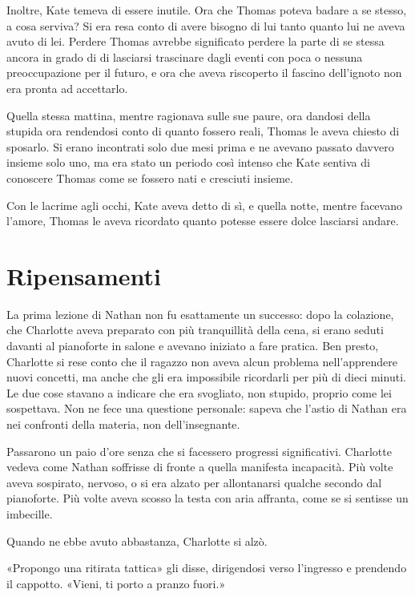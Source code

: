 \documentclass[a4paper,oneside,11pt]{memoir}
\begin{document}
Inoltre, Kate temeva di essere inutile. Ora che Thomas poteva badare a se stesso, a cosa serviva? Si era resa conto di
avere bisogno di lui tanto quanto lui ne aveva avuto di lei. Perdere Thomas avrebbe significato perdere la parte di se
stessa ancora in grado di di lasciarsi trascinare dagli eventi con poca o nessuna preoccupazione per il futuro, e ora
che aveva riscoperto il fascino dell'ignoto non era pronta ad accettarlo.

Quella stessa mattina, mentre ragionava sulle sue paure, ora dandosi della stupida ora rendendosi conto di quanto
fossero reali, Thomas le aveva chiesto di sposarlo. Si erano incontrati solo due mesi prima e ne avevano passato davvero
insieme solo uno, ma era stato un periodo così intenso che Kate sentiva di conoscere Thomas come se fossero nati e
cresciuti insieme.

Con le lacrime agli occhi, Kate aveva detto di sì, e quella notte, mentre facevano l'amore, Thomas le aveva ricordato
quanto potesse essere dolce lasciarsi andare.

\chapter{Ripensamenti}

La prima lezione di Nathan non fu esattamente un successo: dopo la colazione, che Charlotte aveva preparato con più
tranquillità della cena, si erano seduti davanti al pianoforte in salone e avevano iniziato a fare pratica. Ben presto,
Charlotte si rese conto che il ragazzo non aveva alcun problema nell'apprendere nuovi concetti, ma anche che gli era
impossibile ricordarli per più di dieci minuti. Le due cose stavano a indicare che era svogliato, non stupido, proprio
come lei sospettava. Non ne fece una questione personale: sapeva che l'astio di Nathan era nei confronti della materia,
non dell'insegnante.

Passarono un paio d'ore senza che si facessero progressi significativi. Charlotte vedeva come Nathan soffrisse di fronte
a quella manifesta incapacità. Più volte aveva sospirato, nervoso, o si era alzato per allontanarsi qualche secondo dal
pianoforte. Più volte aveva scosso la testa con aria affranta, come se si sentisse un imbecille.

Quando ne ebbe avuto abbastanza, Charlotte si alzò.

«Propongo una ritirata tattica» gli disse, dirigendosi verso l'ingresso e prendendo il cappotto. «Vieni, ti porto a
pranzo fuori.»
\end{document}
